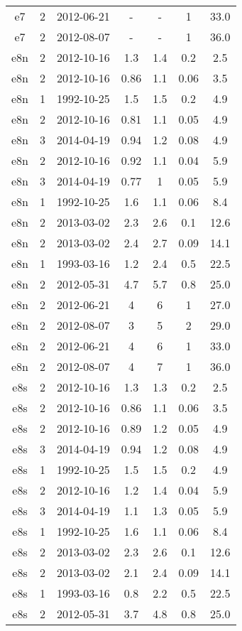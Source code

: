 \begin{longtable}{ccccccc}
e7 & 2 & 2012-06-21 & - & - & 1 & 33.0 \\
e7 & 2 & 2012-08-07 & - & - & 1 & 36.0 \\
e8n & 2 & 2012-10-16 & 1.3 & 1.4 & 0.2 & 2.5 \\
e8n & 2 & 2012-10-16 & 0.86 & 1.1 & 0.06 & 3.5 \\
e8n & 1 & 1992-10-25 & 1.5 & 1.5 & 0.2 & 4.9 \\
e8n & 2 & 2012-10-16 & 0.81 & 1.1 & 0.05 & 4.9 \\
e8n & 3 & 2014-04-19 & 0.94 & 1.2 & 0.08 & 4.9 \\
e8n & 2 & 2012-10-16 & 0.92 & 1.1 & 0.04 & 5.9 \\
e8n & 3 & 2014-04-19 & 0.77 & 1 & 0.05 & 5.9 \\
e8n & 1 & 1992-10-25 & 1.6 & 1.1 & 0.06 & 8.4 \\
e8n & 2 & 2013-03-02 & 2.3 & 2.6 & 0.1 & 12.6 \\
e8n & 2 & 2013-03-02 & 2.4 & 2.7 & 0.09 & 14.1 \\
e8n & 1 & 1993-03-16 & 1.2 & 2.4 & 0.5 & 22.5 \\
e8n & 2 & 2012-05-31 & 4.7 & 5.7 & 0.8 & 25.0 \\
e8n & 2 & 2012-06-21 & 4 & 6 & 1 & 27.0 \\
e8n & 2 & 2012-08-07 & 3 & 5 & 2 & 29.0 \\
e8n & 2 & 2012-06-21 & 4 & 6 & 1 & 33.0 \\
e8n & 2 & 2012-08-07 & 4 & 7 & 1 & 36.0 \\
e8s & 2 & 2012-10-16 & 1.3 & 1.3 & 0.2 & 2.5 \\
e8s & 2 & 2012-10-16 & 0.86 & 1.1 & 0.06 & 3.5 \\
e8s & 2 & 2012-10-16 & 0.89 & 1.2 & 0.05 & 4.9 \\
e8s & 3 & 2014-04-19 & 0.94 & 1.2 & 0.08 & 4.9 \\
e8s & 1 & 1992-10-25 & 1.5 & 1.5 & 0.2 & 4.9 \\
e8s & 2 & 2012-10-16 & 1.2 & 1.4 & 0.04 & 5.9 \\
e8s & 3 & 2014-04-19 & 1.1 & 1.3 & 0.05 & 5.9 \\
e8s & 1 & 1992-10-25 & 1.6 & 1.1 & 0.06 & 8.4 \\
e8s & 2 & 2013-03-02 & 2.3 & 2.6 & 0.1 & 12.6 \\
e8s & 2 & 2013-03-02 & 2.1 & 2.4 & 0.09 & 14.1 \\
e8s & 1 & 1993-03-16 & 0.8 & 2.2 & 0.5 & 22.5 \\
e8s & 2 & 2012-05-31 & 3.7 & 4.8 & 0.8 & 25.0 \\

\end{longtable}
